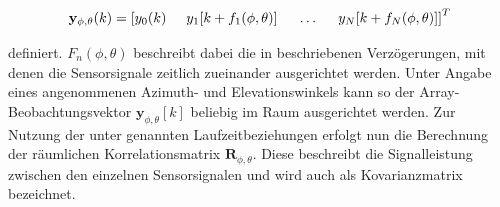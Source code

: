 \begin{equation}\label{eq:DOA_SigVec}
    \mathbf{y}_{\phi,\theta}(k) = \left [ y_0(k) \hspace{0.5cm} y_1 [k + f_1(\phi, \theta) ] \hspace{0.5cm} \dots \hspace{0.5cm} y_N[k+f_N(\phi, \theta) ] \right ]^T
\end{equation}

definiert. $F_n(\phi, \theta)$ beschreibt dabei die in  beschriebenen Verzögerungen, mit denen die Sensorsignale zeitlich zueinander ausgerichtet werden. Unter Angabe eines angenommenen Azimuth- und Elevationswinkels kann so der Array-Beobachtungsvektor $\mathbf{y}_{\phi,\theta}[k]$ beliebig im Raum  ausgerichtet werden. Zur Nutzung der unter  genannten Laufzeitbeziehungen erfolgt nun die Berechnung der räumlichen Korrelationsmatrix $\mathbf{R}_{\phi,\theta}$. Diese beschreibt die Signalleistung zwischen den einzelnen Sensorsignalen und wird auch als Kovarianzmatrix bezeichnet. 






